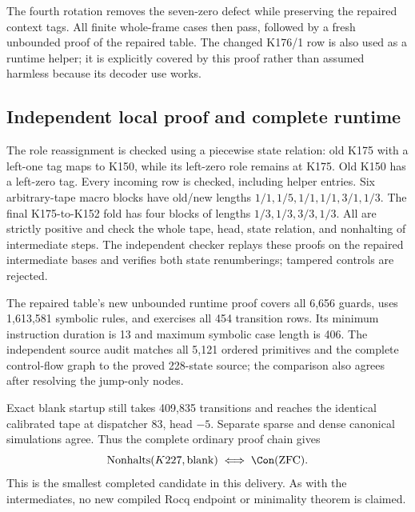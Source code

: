 The fourth rotation removes the seven-zero defect while preserving the
repaired context tags. All finite whole-frame cases then pass, followed by a
fresh unbounded proof of the repaired table. The changed K176/1 row is also
used as a runtime helper; it is explicitly covered by this proof rather than
assumed harmless because its decoder use works.

\subsection{Independent local proof and complete runtime}
The role reassignment is checked using a piecewise state relation: old K175
with a left-one tag maps to K150, while its left-zero role remains at K175.
Old K150 has a left-zero tag. Every incoming row is checked, including helper
entries. Six arbitrary-tape macro blocks have old/new lengths
$1/1,1/5,1/1,1/1,3/1,1/3$. The final K175-to-K152 fold has four blocks of
lengths $1/3,1/3,3/3,1/3$. All are strictly positive and check the whole tape,
head, state relation, and nonhalting of intermediate steps. The independent
checker replays these proofs on the repaired intermediate bases and verifies
both state renumberings; tampered controls are rejected.

The repaired table's new unbounded runtime proof covers all 6,656 guards,
uses 1,613,581 symbolic rules, and exercises all 454 transition rows. Its
minimum instruction duration is 13 and maximum symbolic case length is 406.
The independent source audit matches all 5,121 ordered primitives and the
complete control-flow graph to the proved 228-state source; the comparison
also agrees after resolving the jump-only nodes.

Exact blank startup still takes 409,835 transitions and reaches the identical
calibrated tape at dispatcher 83, head $-5$. Separate sparse and dense
canonical simulations agree. Thus the complete ordinary proof chain gives
\[
 \operatorname{Nonhalts}(K227,\mathrm{blank})\iff\Con(\mathrm{ZFC}).
\]
This is the smallest completed candidate in this delivery. As with the
intermediates, no new compiled Rocq endpoint or minimality theorem is claimed.

